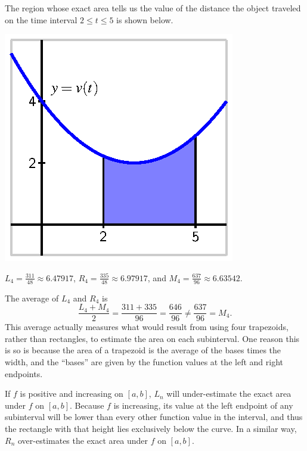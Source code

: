 \begin{activitySolution}
\ba
	\item The region whose exact area tells us the value of the distance the object traveled on the time interval $2 \le t \le 5$ is shown below.
	\begin{center}
		\includegraphics{figures/4_2_Act2Soln.eps}
	\end{center}
	\item $L_4 = \frac{311}{48} \approx 6.47917$, 
	        $R_4 = \frac{335}{48} \approx 6.97917$, and 
	        $M_4 = \frac{637}{96} \approx 6.63542$.
	\item The average of $L_4$ and $R_4$ is
	$$\frac{L_4 + M_4}{2} = \frac{311+335}{96} = \frac{646}{96} \ne \frac{637}{96} = M_4.$$
	This average actually measures what would result from using four trapezoids, rather than rectangles, to estimate the area on each subinterval.  One reason this is so is because the area of a trapezoid is the average of the bases times the width, and the ``bases'' are given by the function values at the left and right endpoints.
	\item If $f$ is positive and increasing on $[a,b]$, $L_n$ will under-estimate the exact area under $f$ on $[a,b]$.  Because $f$ is increasing, its value at the left endpoint of any subinterval will be lower than every other function value in the interval, and thus the rectangle with that height lies exclusively below the curve.  In a similar way, $R_n$ over-estimates the exact area under $f$ on $[a,b]$.
\ea
\end{activitySolution}
\aftera
